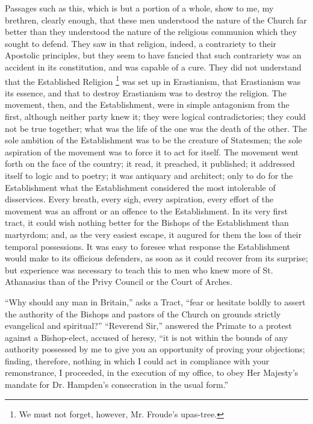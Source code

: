 Passages such as this, which is but a portion of a whole, show to
me, my brethren, clearly enough, that these men understood the nature
of the Church far better than they understood the nature of the
religious communion which they sought to defend. They saw in that
religion, indeed, a contrariety to their Apostolic principles, but
they seem to have fancied that such contrariety was an accident in its
constitution, and was capable of a cure. They did not understand that
the Established Religion \footnote{We must not forget, however, Mr. Froude's
upas-tree.}
was set up in Erastianism, that Erastianism was its essence, and that
to destroy Erastianism was to destroy the religion. The movement,
then, and the Establishment, were in simple antagonism from the first,
although neither party knew it; they were logical contradictories;
they could not be true together; what was the life of the one was the
death of the other. The sole ambition of the Establishment was to be
the creature of Statesmen; the sole aspiration of the movement was to
force it to act for itself. The movement went forth on the face of the
country; it read, it preached, it published; it addressed itself to
logic and to poetry; it was antiquary and architect; only to do for
the Establishment what the Establishment considered the most
intolerable of disservices. Every breath, every sigh, every
aspiration, every effort of the movement was an affront or an offence
to the Establishment. In its very first tract, it could wish nothing
better for the Bishops of the Establishment than martyrdom; and, as
the very easiest escape, it augured for them the loss of their
temporal possessions. It was easy to foresee what response the
Establishment would make to its officious defenders, as soon as it
could recover from its surprise; but experience was necessary to teach
this to men who knew more of St. Athanasius than of the Privy Council
or the Court of Arches.

``Why should any man in Britain,'' asks a Tract, ``fear
or hesitate boldly to assert the authority of the Bishops and pastors
of the Church on grounds strictly evangelical and spiritual?''
``Reverend Sir,'' answered the Primate to a protest against a
Bishop-elect, accused of heresy, ``it is not within the bounds of
any authority possessed by me to give you an opportunity of proving
your objections; finding, therefore, nothing in which I could act in
compliance with your remonstrance, I proceeded, in the execution of my
office, to obey Her Majesty's mandate for Dr. Hampden's consecration
in the usual form.''

